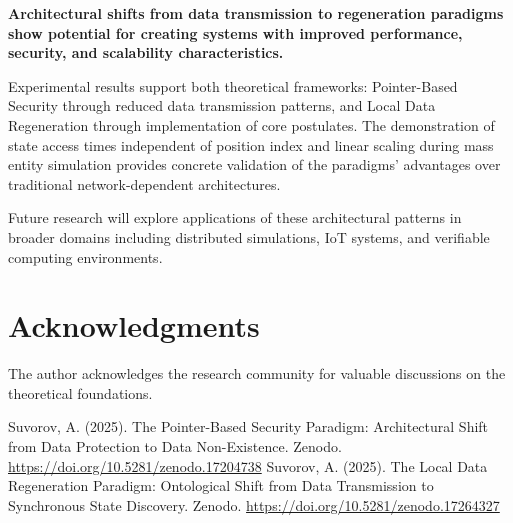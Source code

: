 \documentclass[14pt, a4paper]{extarticle}
\begin{document}
\textbf{Architectural shifts from data transmission to regeneration paradigms show potential for creating systems with improved performance, security, and scalability characteristics.}

Experimental results support both theoretical frameworks: Pointer-Based Security through reduced data transmission patterns, and Local Data Regeneration through implementation of core postulates. The demonstration of state access times independent of position index and linear scaling during mass entity simulation provides concrete validation of the paradigms' advantages over traditional network-dependent architectures.

Future research will explore applications of these architectural patterns in broader domains including distributed simulations, IoT systems, and verifiable computing environments.

\section*{Acknowledgments}
The author acknowledges the research community for valuable discussions on the theoretical foundations.

\begin{thebibliography}{9}
 Suvorov, A. (2025). The Pointer-Based Security Paradigm: Architectural Shift from Data Protection to Data Non-Existence. Zenodo. \url{https://doi.org/10.5281/zenodo.17204738}
 Suvorov, A. (2025). The Local Data Regeneration Paradigm: Ontological Shift from Data Transmission to Synchronous State Discovery. Zenodo. \url{https://doi.org/10.5281/zenodo.17264327}
\end{thebibliography}
\end{document}
